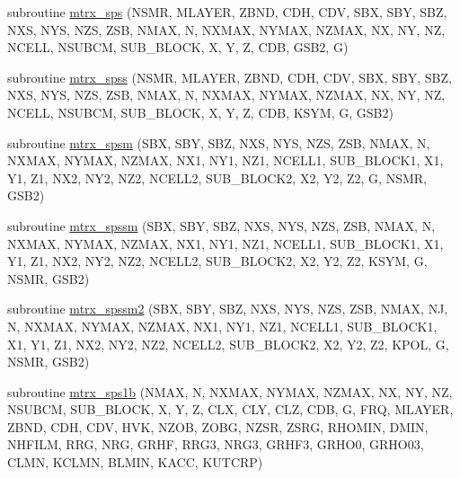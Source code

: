 \begin{DoxyCompactItemize}
\item 
subroutine \hyperlink{Marco_8f90_a34ea4787df30b5632f6a1785977f2402}{mtrx\+\_\+sps} (N\+S\+MR, M\+L\+A\+Y\+ER, Z\+B\+ND, C\+DH, C\+DV, S\+BX, S\+BY, S\+BZ, N\+XS, N\+YS, N\+ZS, Z\+SB, N\+M\+AX, N, N\+X\+M\+AX, N\+Y\+M\+AX, N\+Z\+M\+AX, NX, NY, NZ, N\+C\+E\+LL, N\+S\+U\+B\+CM, S\+U\+B\+\_\+\+B\+L\+O\+CK, X, Y, Z, C\+DB, G\+S\+B2, G)
\item 
subroutine \hyperlink{Marco_8f90_a9b8cd7f2e81c5d270b9963c9f3f80f67}{mtrx\+\_\+spss} (N\+S\+MR, M\+L\+A\+Y\+ER, Z\+B\+ND, C\+DH, C\+DV, S\+BX, S\+BY, S\+BZ, N\+XS, N\+YS, N\+ZS, Z\+SB, N\+M\+AX, N, N\+X\+M\+AX, N\+Y\+M\+AX, N\+Z\+M\+AX, NX, NY, NZ, N\+C\+E\+LL, N\+S\+U\+B\+CM, S\+U\+B\+\_\+\+B\+L\+O\+CK, X, Y, Z, C\+DB, K\+S\+YM, G, G\+S\+B2)
\item 
subroutine \hyperlink{Marco_8f90_a6af8c7cf82dc910740ea6b8565200037}{mtrx\+\_\+spsm} (S\+BX, S\+BY, S\+BZ, N\+XS, N\+YS, N\+ZS, Z\+SB, N\+M\+AX, N, N\+X\+M\+AX, N\+Y\+M\+AX, N\+Z\+M\+AX, N\+X1, N\+Y1, N\+Z1, N\+C\+E\+L\+L1, S\+U\+B\+\_\+\+B\+L\+O\+C\+K1, X1, Y1, Z1, N\+X2, N\+Y2, N\+Z2, N\+C\+E\+L\+L2, S\+U\+B\+\_\+\+B\+L\+O\+C\+K2, X2, Y2, Z2, G, N\+S\+MR, G\+S\+B2)
\item 
subroutine \hyperlink{Marco_8f90_afcb6780579e2ba238d661f0c3425dde9}{mtrx\+\_\+spssm} (S\+BX, S\+BY, S\+BZ, N\+XS, N\+YS, N\+ZS, Z\+SB, N\+M\+AX, N, N\+X\+M\+AX, N\+Y\+M\+AX, N\+Z\+M\+AX, N\+X1, N\+Y1, N\+Z1, N\+C\+E\+L\+L1, S\+U\+B\+\_\+\+B\+L\+O\+C\+K1, X1, Y1, Z1, N\+X2, N\+Y2, N\+Z2, N\+C\+E\+L\+L2, S\+U\+B\+\_\+\+B\+L\+O\+C\+K2, X2, Y2, Z2, K\+S\+YM, G, N\+S\+MR, G\+S\+B2)
\item 
subroutine \hyperlink{Marco_8f90_ac9d0c58e3d3c8bd0e73c6eb53c79f71c}{mtrx\+\_\+spssm2} (S\+BX, S\+BY, S\+BZ, N\+XS, N\+YS, N\+ZS, Z\+SB, N\+M\+AX, NJ, N, N\+X\+M\+AX, N\+Y\+M\+AX, N\+Z\+M\+AX, N\+X1, N\+Y1, N\+Z1, N\+C\+E\+L\+L1, S\+U\+B\+\_\+\+B\+L\+O\+C\+K1, X1, Y1, Z1, N\+X2, N\+Y2, N\+Z2, N\+C\+E\+L\+L2, S\+U\+B\+\_\+\+B\+L\+O\+C\+K2, X2, Y2, Z2, K\+P\+OL, G, N\+S\+MR, G\+S\+B2)
\item 
subroutine \hyperlink{Marco_8f90_aefe021b6f1e5d06c1e5f731ef776542d}{mtrx\+\_\+sps1b} (N\+M\+AX, N, N\+X\+M\+AX, N\+Y\+M\+AX, N\+Z\+M\+AX, NX, NY, NZ, N\+S\+U\+B\+CM, S\+U\+B\+\_\+\+B\+L\+O\+CK, X, Y, Z, C\+LX, C\+LY, C\+LZ, C\+DB, G, F\+RQ, M\+L\+A\+Y\+ER, Z\+B\+ND, C\+DH, C\+DV, H\+VK, N\+Z\+OB, Z\+O\+BG, N\+Z\+SR, Z\+S\+RG, R\+H\+O\+M\+IN, D\+M\+IN, N\+H\+F\+I\+LM, R\+RG, N\+RG, G\+R\+HF, R\+R\+G3, N\+R\+G3, G\+R\+H\+F3, G\+R\+H\+O0, G\+R\+H\+O03, C\+L\+MN, K\+C\+L\+MN, B\+L\+M\+IN, K\+A\+CC, K\+U\+T\+C\+RP)

\end{DoxyCompactItemize}
